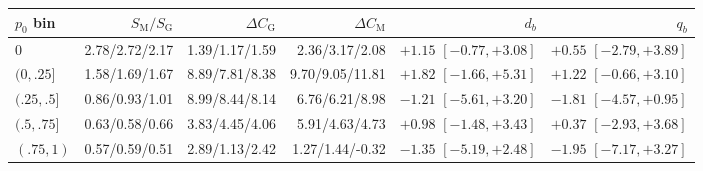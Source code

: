 \begin{tabular}{lrrrrr}
\toprule
$p_0$ bin & $S_{\mathrm M}/S_{\mathrm G}$ & $\Delta C_{\mathrm G}$ & $\Delta C_{\mathrm M}$ & $d_b$ & $q_b$ \\
\midrule
$0$ & 2.78/2.72/2.17 & 1.39/1.17/1.59 & 2.36/3.17/2.08 & ${+}1.15$ $[-0.77, +3.08]$ & ${+}0.55$ $[-2.79, +3.89]$ \\
$(0,.25]$ & 1.58/1.69/1.67 & 8.89/7.81/8.38 & 9.70/9.05/11.81 & ${+}1.82$ $[-1.66, +5.31]$ & ${+}1.22$ $[-0.66, +3.10]$ \\
$(.25,.5]$ & 0.86/0.93/1.01 & 8.99/8.44/8.14 & 6.76/6.21/8.98 & $-1.21$ $[-5.61, +3.20]$ & $-1.81$ $[-4.57, +0.95]$ \\
$(.5,.75]$ & 0.63/0.58/0.66 & 3.83/4.45/4.06 & 5.91/4.63/4.73 & ${+}0.98$ $[-1.48, +3.43]$ & ${+}0.37$ $[-2.93, +3.68]$ \\
$(.75,1)$ & 0.57/0.59/0.51 & 2.89/1.13/2.42 & 1.27/1.44/-0.32 & $-1.35$ $[-5.19, +2.48]$ & $-1.95$ $[-7.17, +3.27]$ \\
\bottomrule
\end{tabular}
